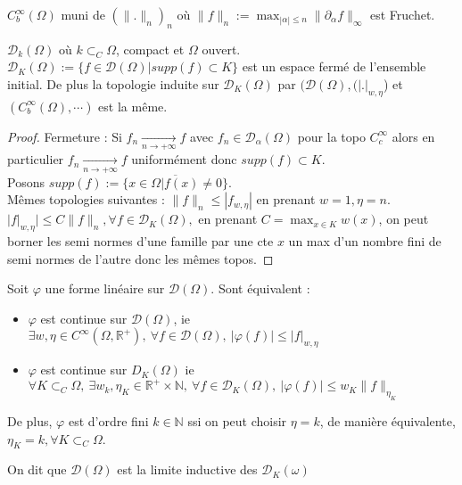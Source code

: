 \begin{ex}
    $C^\infty _b(\Omega)$ muni de $(\|.\|_n)_n$   où $\|f\|_n:=\max_{|\alpha |\le n}\|\partial _\alpha f\|_{\infty }$ est Fruchet.
\end{ex}
\begin{proposition}
    $\mathcal{D}_k(\Omega)$   où $k\subset _C\Omega$, compact et $\Omega$  ouvert. $\mathcal{D}_K(\Omega):=\{f\in \mathcal{D}(\Omega)|supp(f)\subset K\} $  est un espace fermé de l'ensemble initial. De plus la topologie induite sur $\mathcal{D}_K(\Omega)$ par $(\mathcal{D}(\Omega),(|.|_{w, \eta}$) et $(C^\infty _b(\Omega),\cdots)$ est la même.
\end{proposition}
\begin{proof}
    Fermeture : Si $f_n \xrightarrow[n\to +\infty]{} f$ avec $f_n\in \mathcal{D}_\alpha (\Omega)$ pour la topo $C^\infty _c$ alors en particulier $f_n \xrightarrow[n\to +\infty]{} f$ uniformément donc $supp(f)\subset K$.\\
    Posons $supp(f):=\overline{\{x\in \Omega|f(x)\neq 0\}}$.\\
    Mêmes topologies suivantes : $\|f\|_n\le |f_{w, \eta}|$ en prenant $w=1, \eta=n$. $|f|_{w, \eta}|\le C\|f\|_n, \forall f\in \mathcal{D}_K(\Omega),$ en prenant $C=\max_{x\in K}w(x)$, on peut borner les semi normes d'une famille par une cte $x$ un max d'un nombre fini de semi normes de l'autre donc les mêmes topos.
\end{proof}
\begin{proposition}
    Soit $\varphi $  une forme linéaire sur $\mathcal{D}(\Omega)$. Sont équivalent :
    \begin{itemize}
        \item $\varphi $  est continue sur $\mathcal{D}(\Omega)$, ie $\exists w, \eta\in C^\infty (\Omega,\mathbb{R} ^+),\ \forall f\in \mathcal{D}(\Omega),\ |\varphi (f)|\le |f|_{w, \eta} $
        \item $\varphi $  est continue sur $D_K(\Omega)$  ie $\forall K\subset _C\Omega,\ \exists w_k, \eta_K\in \mathbb{R} ^+\times \mathbb{N} ,\ \forall f\in \mathcal{D}_K(\Omega),\ |\varphi (f)|\le w_K\|f\|_{\eta_K}  $
    \end{itemize}
    De plus, $\varphi $  est d'ordre fini $k\in \mathbb{N} $  ssi on peut choisir $\eta=k$, de manière équivalente, $\eta_K=k,\forall K\subset _C\Omega $.
\end{proposition}
\begin{remarque}
    On dit que $\mathcal{D}(\Omega)$ est la limite inductive des $\mathcal{D}_K(\omega)$
\end{remarque}

